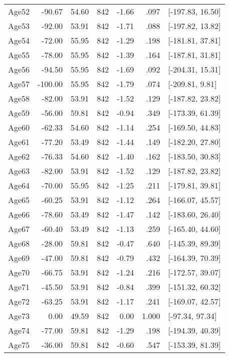 \begin{table}[ht]
\begin{tabular}{lrrrrrl}
  Age52 & -90.67 & 54.60 & 842 & -1.66 & .097 & [-197.83, 16.50] \\ 
  Age53 & -92.00 & 53.91 & 842 & -1.71 & .088 & [-197.82, 13.82] \\ 
  Age54 & -72.00 & 55.95 & 842 & -1.29 & .198 & [-181.81, 37.81] \\ 
  Age55 & -78.00 & 55.95 & 842 & -1.39 & .164 & [-187.81, 31.81] \\ 
  Age56 & -94.50 & 55.95 & 842 & -1.69 & .092 & [-204.31, 15.31] \\ 
  Age57 & -100.00 & 55.95 & 842 & -1.79 & .074 & [-209.81, 9.81] \\ 
  Age58 & -82.00 & 53.91 & 842 & -1.52 & .129 & [-187.82, 23.82] \\ 
  Age59 & -56.00 & 59.81 & 842 & -0.94 & .349 & [-173.39, 61.39] \\ 
  Age60 & -62.33 & 54.60 & 842 & -1.14 & .254 & [-169.50, 44.83] \\ 
  Age61 & -77.20 & 53.49 & 842 & -1.44 & .149 & [-182.20, 27.80] \\ 
  Age62 & -76.33 & 54.60 & 842 & -1.40 & .162 & [-183.50, 30.83] \\ 
  Age63 & -82.00 & 53.91 & 842 & -1.52 & .129 & [-187.82, 23.82] \\ 
  Age64 & -70.00 & 55.95 & 842 & -1.25 & .211 & [-179.81, 39.81] \\ 
  Age65 & -60.25 & 53.91 & 842 & -1.12 & .264 & [-166.07, 45.57] \\ 
  Age66 & -78.60 & 53.49 & 842 & -1.47 & .142 & [-183.60, 26.40] \\ 
  Age67 & -60.40 & 53.49 & 842 & -1.13 & .259 & [-165.40, 44.60] \\ 
  Age68 & -28.00 & 59.81 & 842 & -0.47 & .640 & [-145.39, 89.39] \\ 
  Age69 & -47.00 & 59.81 & 842 & -0.79 & .432 & [-164.39, 70.39] \\ 
  Age70 & -66.75 & 53.91 & 842 & -1.24 & .216 & [-172.57, 39.07] \\ 
  Age71 & -45.50 & 53.91 & 842 & -0.84 & .399 & [-151.32, 60.32] \\ 
  Age72 & -63.25 & 53.91 & 842 & -1.17 & .241 & [-169.07, 42.57] \\ 
  Age73 & 0.00 & 49.59 & 842 & 0.00 & 1.000 & [-97.34, 97.34] \\ 
  Age74 & -77.00 & 59.81 & 842 & -1.29 & .198 & [-194.39, 40.39] \\ 
  Age75 & -36.00 & 59.81 & 842 & -0.60 & .547 & [-153.39, 81.39] \\ 

\end{tabular}
\end{table}
